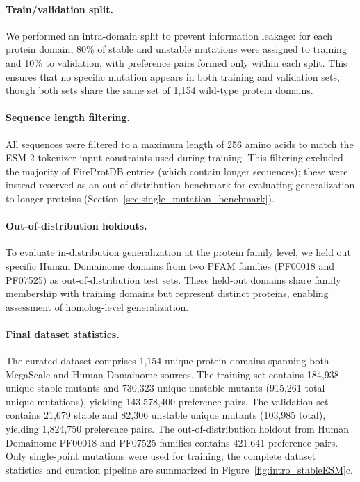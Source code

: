 \paragraph{Train/validation split.}
We performed an intra-domain split to prevent information leakage: for each protein domain, 80\% of stable and unstable mutations were assigned to training and 10\% to validation, with preference pairs formed only within each split.
This ensures that no specific mutation appears in both training and validation sets, though both sets share the same set of 1{,}154 wild-type protein domains.

\paragraph{Sequence length filtering.}
All sequences were filtered to a maximum length of 256 amino acids to match the ESM-2 tokenizer input constraints used during training.
This filtering excluded the majority of FireProtDB entries (which contain longer sequences); these were instead reserved as an out-of-distribution benchmark for evaluating generalization to longer proteins (Section~\ref{sec:single_mutation_benchmark}).

\paragraph{Out-of-distribution holdouts.}
To evaluate in-distribution generalization at the protein family level, we held out specific Human Domainome domains from two PFAM families (PF00018 and PF07525) as out-of-distribution test sets.
These held-out domains share family membership with training domains but represent distinct proteins, enabling assessment of homolog-level generalization.

\paragraph{Final dataset statistics.}
The curated dataset comprises 1{,}154 unique protein domains spanning both MegaScale and Human Domainome sources.
The training set contains 184{,}938 unique stable mutants and 730{,}323 unique unstable mutants (915{,}261 total unique mutations), yielding 143{,}578{,}400 preference pairs.
The validation set contains 21{,}679 stable and 82{,}306 unstable unique mutants (103{,}985 total), yielding 1{,}824{,}750 preference pairs.
The out-of-distribution holdout from Human Domainome PF00018 and PF07525 families contains 421{,}641 preference pairs.
Only single-point mutations were used for training; the complete dataset statistics and curation pipeline are summarized in Figure~\ref{fig:intro_stableESM}c.

